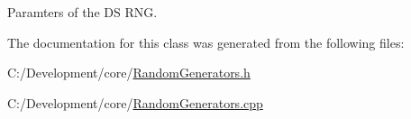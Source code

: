 Paramters of the D\-S R\-N\-G. 



The documentation for this class was generated from the following files\-:\begin{DoxyCompactItemize}
\item 
C\-:/\-Development/core/\hyperlink{_random_generators_8h}{Random\-Generators.\-h}\item 
C\-:/\-Development/core/\hyperlink{_random_generators_8cpp}{Random\-Generators.\-cpp}\end{DoxyCompactItemize}
